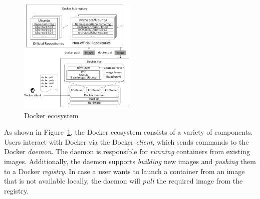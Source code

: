 \begin{figure}
	\centering
	\includegraphics[width=0.5\textwidth]{graphs/fig-docker-architecture}
	\caption{Docker ecosystem }\label{fig-docker-architecture}
\end{figure}

As shown in Figure~\ref{fig-docker-architecture}, the Docker ecosystem consists
of a variety of components.
%
Users interact with Docker via the Docker \emph{client}, which sends commands
to the Docker \emph{daemon}. The daemon is responsible for \emph{running} containers
from existing images. Additionally, the daemon supports \emph{building} new images and
\emph{pushing} them to a Docker \emph{registry}. In case a user wants to launch a
container from an image that is not available locally, the daemon will \emph{pull}
the required image from the registry.



